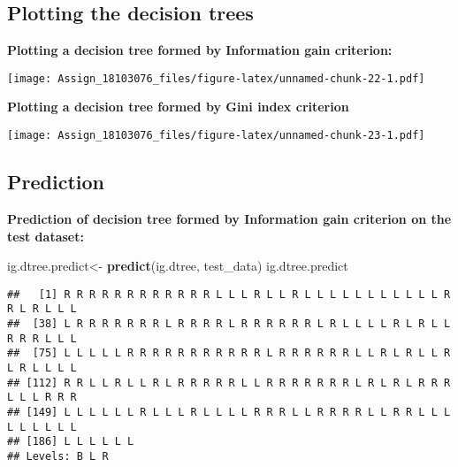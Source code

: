 \documentclass[
]{article}
\newenvironment{Shaded}{\begin{snugshade}}{\end{snugshade}}
\newcommand{\DataTypeTok}[1]{\textcolor[rgb]{0.13,0.29,0.53}{#1}}
\newcommand{\FloatTok}[1]{\textcolor[rgb]{0.00,0.00,0.81}{#1}}
\newcommand{\KeywordTok}[1]{\textcolor[rgb]{0.13,0.29,0.53}{\textbf{#1}}}
\newcommand{\NormalTok}[1]{#1}
\newcommand{\OperatorTok}[1]{\textcolor[rgb]{0.81,0.36,0.00}{\textbf{#1}}}
\newcommand{\StringTok}[1]{\textcolor[rgb]{0.31,0.60,0.02}{#1}}
\begin{document}
\hypertarget{plotting-the-decision-trees}{%
\subsection{\texorpdfstring{\textbf{Plotting the decision
trees}}{Plotting the decision trees}}\label{plotting-the-decision-trees}}

\textbf{Plotting a decision tree formed by Information gain criterion:}

\begin{Shaded}
\end{Shaded}

\texttt{[image: Assign\_18103076\_files/figure-latex/unnamed-chunk-22-1.pdf]}

\textbf{Plotting a decision tree formed by Gini index criterion}

\begin{Shaded}
\end{Shaded}

\texttt{[image: Assign\_18103076\_files/figure-latex/unnamed-chunk-23-1.pdf]}

\hypertarget{prediction}{%
\subsection{\texorpdfstring{\textbf{Prediction}}{Prediction}}\label{prediction}}

\textbf{Prediction of decision tree formed by Information gain criterion
on the test dataset:}

\begin{Shaded}
\begin{Highlighting}[]
\NormalTok{ig.dtree.predict<-}\StringTok{ }\KeywordTok{predict}\NormalTok{(ig.dtree, test_data)}
\NormalTok{ig.dtree.predict}
\end{Highlighting}
\end{Shaded}

\begin{verbatim}
##   [1] R R R R R R R R R R R R L L L R L L R L L L L L L L L L L L R R L R L L L
##  [38] L R R R R R R R L R R R R L R R R R R R L R L L L L R L R L L R R R L L L
##  [75] L L L L L R R R R R R R R R R R L R R R R R R L L R L R L L R L R L L L L
## [112] R R L L R L L R L R R R R R L L R R R R R R R L R L R L R R R L L L R R R
## [149] L L L L L L R L L L R L L L L R R R L L R R R R L L R R L L L L L L L L L
## [186] L L L L L L
## Levels: B L R
\end{verbatim}
\end{document}
